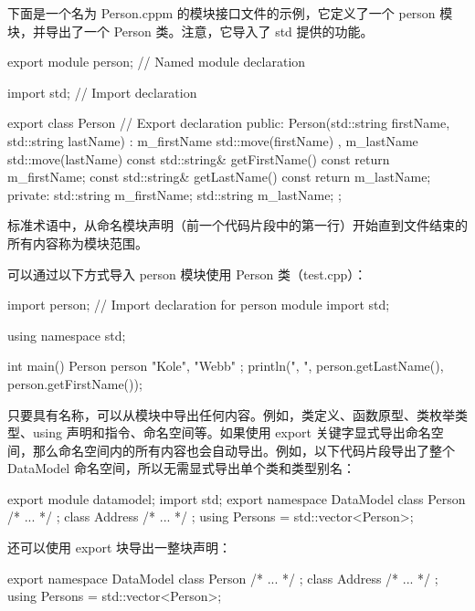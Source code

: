 下面是一个名为 Person.cppm 的模块接口文件的示例，它定义了一个 person 模块，并导出了一个 Person 类。注意，它导入了 std 提供的功能。

\begin{cpp}
export module person; // Named module declaration

import std; // Import declaration

export class Person // Export declaration
{
    public:
        Person(std::string firstName, std::string lastName)
            : m_firstName { std::move(firstName) }
            , m_lastName { std::move(lastName) } { }
        const std::string& getFirstName() const { return m_firstName; }
        const std::string& getLastName() const { return m_lastName; }
    private:
        std::string m_firstName;
        std::string m_lastName;
};
\end{cpp}

标准术语中，从命名模块声明（前一个代码片段中的第一行）开始直到文件结束的所有内容称为模块范围。

可以通过以下方式导入 person 模块使用 Person 类（test.cpp）：

\begin{cpp}
import person; // Import declaration for person module
import std;

using namespace std;

int main()
{
    Person person { "Kole", "Webb" };
    println("{}, {}", person.getLastName(), person.getFirstName());
}
\end{cpp}

只要具有名称，可以从模块中导出任何内容。例如，类定义、函数原型、类枚举类型、using 声明和指令、命名空间等。如果使用 export 关键字显式导出命名空间，那么命名空间内的所有内容也会自动导出。例如，以下代码片段导出了整个 DataModel 命名空间，所以无需显式导出单个类和类型别名：

\begin{cpp}
export module datamodel;
import std;
export namespace DataModel
{
    class Person { /* ... */ };
    class Address { /* ... */ };
    using Persons = std::vector<Person>;
}
\end{cpp}

还可以使用 export 块导出一整块声明：

\begin{cpp}
export
{
    namespace DataModel
    {
        class Person { /* ... */ };
        class Address { /* ... */ };
        using Persons = std::vector<Person>;
    }
}
\end{cpp}


